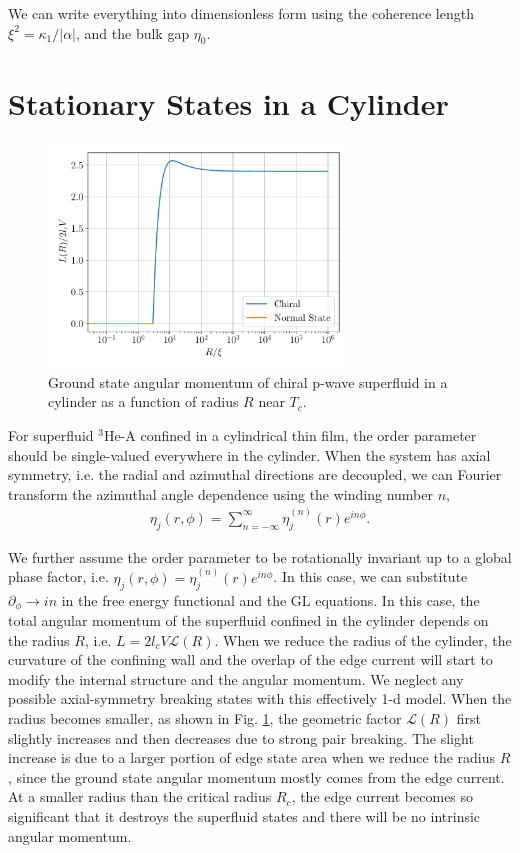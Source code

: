 \documentclass[aps,prb,reprint,groupedaddress]{revtex4-2}
\begin{document}
We can write everything into dimensionless form using the coherence length
$\xi^2=\kappa_1/|\alpha|$, and the bulk gap $\eta_0$.

\section{Stationary States in a Cylinder}\label{sec:ChiralCylinder}

\begin{figure}
    \centering
    \includegraphics[width=8cm]{L_r.pdf}
    \caption{Ground state angular momentum of chiral p-wave superfluid
        in a cylinder as a function of radius $R$ near $T_c$.}
    \label{fig:L_r_cylinder}
\end{figure}

For superfluid $^3$He-A confined in a cylindrical thin film,
the order parameter should be single-valued everywhere in the cylinder.
When the system has axial symmetry, i.e. the radial and azimuthal directions are decoupled,
we can Fourier transform the azimuthal angle dependence using
the winding number $n$,
\begin{align}
    \eta_j(r,\phi)=\sum_{n=-\infty}^{\infty}\eta_j^{(n)}(r)e^{in\phi}.
\end{align}

We further assume the order parameter to be rotationally invariant
up to a global phase factor, i.e. $\eta_j(r,\phi)=\eta_j^{(n)}(r)e^{in\phi}$.
In this case, we can substitute $\partial_\phi\rightarrow in$
in the free energy functional and the GL equations.
In this case, the total angular momentum of the superfluid confined in the cylinder
depends on the radius $R$, i.e. $L = 2l_c V \mathcal{L}(R)$.
When we reduce the radius of the cylinder, the curvature of the confining wall
and the overlap of the edge current will start to modify the internal structure
and the angular momentum. We neglect any possible axial-symmetry breaking states
with this effectively 1-d model. When the radius becomes smaller, as shown in
Fig. \ref{fig:L_r_cylinder}, the geometric factor $\mathcal{L}(R)$ first slightly
increases and then decreases due to strong pair breaking. The slight increase is
due to a larger portion of edge state area when we reduce the radius $R$, since
the ground state angular momentum mostly comes from the edge current. At a smaller
radius than the critical radius $R_c$, the edge current becomes so significant that
it destroys the superfluid states and there will be no intrinsic angular momentum.
\end{document}
